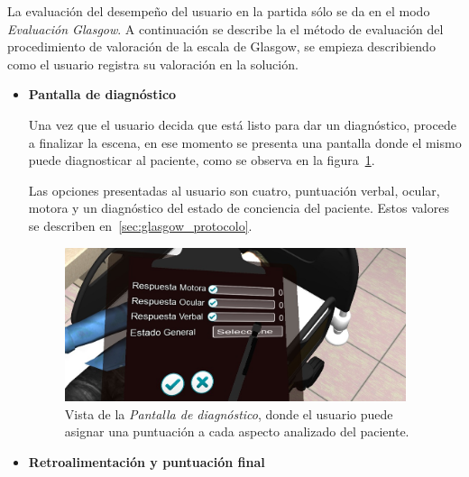 La evaluación del desempeño del usuario en la partida sólo se da en el modo \emph{Evaluación 
Glasgow}. A continuación se describe la el método de evaluación del procedimiento 
de valoración de la escala  de Glasgow, se empieza describiendo como el 
usuario registra su valoración en la solución.

\begin{itemize}
\item{\textbf{Pantalla de diagnóstico}}

Una vez que el usuario decida que está listo para dar un diagnóstico, procede a
finalizar la escena, en ese momento se presenta una pantalla donde el mismo
puede diagnosticar al paciente, como se observa en la
figura~\ref{fig:glasgow_gui_resultados}.

Las opciones presentadas al usuario son cuatro, puntuación verbal, ocular,
motora y un diagnóstico del estado de conciencia del paciente. Estos valores
se describen en~\ref{sec:glasgow_protocolo}.

\begin{figure}[H]
\centering
\includegraphics[width=10cm]{solucion/images/glasgow_diagnostico.jpg}
\caption{Vista de la \emph{Pantalla de diagnóstico}, donde el usuario puede
    asignar una puntuación a cada aspecto analizado del paciente.}
\label{fig:glasgow_gui_resultados}
\end{figure}




\item{\textbf{Retroalimentación y puntuación final}}


\end{itemize}
